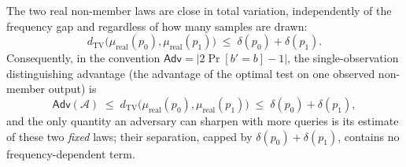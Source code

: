 \documentclass[sigconf,nonacm,anonymous,balance=false]{acmart}
\newcommand{\TV}{d_{\mathrm{TV}}}
\newcommand{\Adv}{\mathsf{Adv}}             %
\newcommand{\lawreal}{\mu_{\mathrm{real}}}  %
\begin{document}
\begin{theorem}
\label{thm:freqdist-real}
The two real non-member laws are close in total variation, independently of the frequency gap and
regardless of how many samples are drawn:
\[
  \TV\big(\lawreal(p_0), \lawreal(p_1)\big) \;\le\; \delta(p_0) + \delta(p_1).
\]
Consequently, in the convention $\Adv = |2\Pr[b'=b]-1|$, the single-observation
distinguishing advantage (the advantage of the optimal test on one observed non-member
output) is
\[
  \Adv(\mathcal{A}) \;\le\; \TV\big(\lawreal(p_0), \lawreal(p_1)\big)
  \;\le\; \delta(p_0) + \delta(p_1),
\]
and the only quantity an adversary can sharpen with more queries is its estimate of these
two \emph{fixed} laws; their separation, capped by $\delta(p_0)+\delta(p_1)$, contains no
frequency-dependent term.
\end{theorem}
\end{document}
